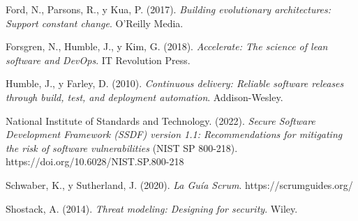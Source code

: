 \documentclass[formulario]{../../comun/overfore}
\begin{document}
\begin{referencias}
\item Ford, N., Parsons, R., y Kua, P. (2017). \emph{Building evolutionary architectures: Support constant change}. O'Reilly Media.
\item Forsgren, N., Humble, J., y Kim, G. (2018). \emph{Accelerate: The science of lean software and DevOps}. IT Revolution Press.
\item Humble, J., y Farley, D. (2010). \emph{Continuous delivery: Reliable software releases through build, test, and deployment automation}. Addison-Wesley.
\item National Institute of Standards and Technology. (2022). \emph{Secure Software Development Framework (SSDF) version 1.1: Recommendations for mitigating the risk of software vulnerabilities} (NIST SP 800-218). https://doi.org/10.6028/NIST.SP.800-218
\item Schwaber, K., y Sutherland, J. (2020). \emph{La Guía Scrum}. https://scrumguides.org/
\item Shostack, A. (2014). \emph{Threat modeling: Designing for security}. Wiley.
\end{referencias}
\end{document}
